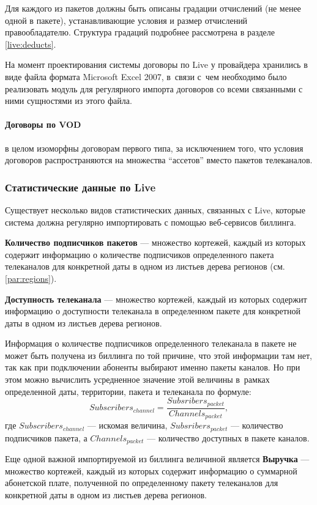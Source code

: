 Для каждого из пакетов должны быть описаны градации отчислений (не менее одной в пакете), устанавливающие условия и размер
отчислений правообладателю. Структура градаций подробнее рассмотрена в разделе \ref{live:deducts}.

На момент проектирования системы договоры по Live у провайдера хранились в виде файла формата Microsoft Excel 2007, в~связи с~чем
необходимо было реализовать модуль для регулярного импорта договоров со всеми связанными с ними сущностями из этого файла.

\paragraph{Договоры по VOD} в целом изоморфны договорам первого типа, за исключением того, что условия договоров распространяются на множества ``ассетов''
вместо пакетов телеканалов.

\subsubsection{Статистические данные по Live}
\label{stat:live}
Существует несколько видов статистических данных, связанных с Live, которые система должна регулярно импортировать
с помощью веб-сервисов биллинга.

\textbf{Количество подписчиков пакетов} --- множество кортежей, каждый из которых содержит информацию о количестве подписчиков
определенного пакета телеканалов для конкретной даты в одном из листьев дерева регионов (см. \ref{par:regions}).

\textbf{Доступность телеканала} --- множество кортежей, каждый из которых содержит информацию о доступности телеканала в
определенном пакете для конкретной даты в одном из листьев дерева регионов.

\label{stat:subscribers}
Информация о количестве подписчиков определенного телеканала в пакете не может быть получена из биллинга по той причине, что этой информации там нет, 
так как при подключении абоненты выбирают именно пакеты каналов. Но при этом можно вычислить усредненное значение этой величины 
в~рамках определенной даты, территории, пакета и телеканала по формуле:
$$Subscribers_{channel} = \frac{Subsribers_{packet}} {Channels_{packet}}, $$
где $Subscribers_{channel}$ --- искомая величина,  $Subsribers_{packet}$ --- количество подписчиков пакета, 
а $Channels_{packet}$ --- количество доступных в пакете каналов.

Еще одной важной импортируемой из биллинга величиной является \textbf{Выручка} --- множество кортежей, каждый из которых содержит информацию о
суммарной абонетской плате, полученной по определенному пакету телеканалов для конкретной даты в одном из листьев дерева регионов.
 

